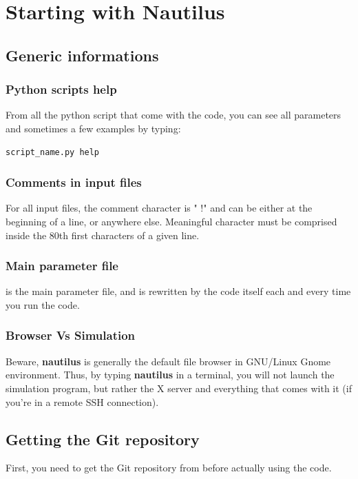 \documentclass[english,a4paper,twoside]{article}
\begin{document}
\section{Starting with Nautilus}
\subsection{Generic informations}
\subsubsection{Python scripts help}\label{sec:python-help}
From all the python script that come with the code, you can see all parameters and sometimes a few examples by typing:
\begin{verbatim}
script_name.py help
\end{verbatim}

\subsubsection{Comments in input files}\label{sec:files_generic_info}
For all input files, the comment character is " !" and can be either at the beginning of a line, or anywhere else. Meaningful character must be comprised inside the 80th first characters of a given line.

\subsubsection{Main parameter file}
 is the main parameter file, and is rewritten by the code itself each and every time you run the code. 

\subsubsection{Browser Vs Simulation}
Beware, \textbf{nautilus} is generally the default file browser in GNU/Linux Gnome environment. Thus, by typing \textbf{nautilus} in a terminal, you will not launch the simulation program, but rather the X server and everything that comes with it (if you're in a remote SSH connection).


\subsection{Getting the Git repository}
First, you need to get the Git repository from  before actually using the code. 
\end{document}
